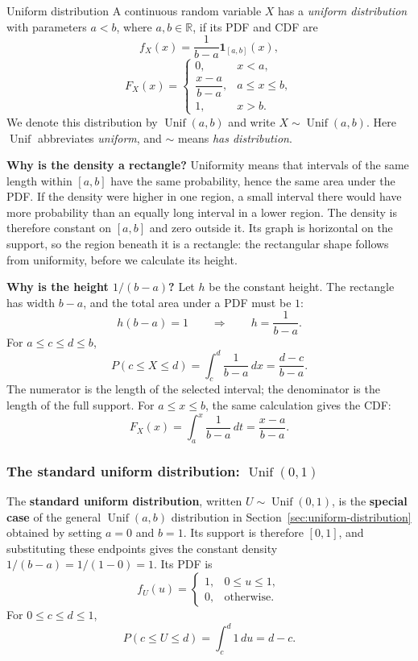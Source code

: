 \documentclass[a4paper,12pt,oneside]{report}
\begin{document}
\begin{frameddefn}{Uniform distribution}
\label{def:uniform-distribution}
A continuous random variable $X$ has a \emph{uniform distribution}
with parameters $a<b$, where $a,b\in\mathbb R$, if its PDF and CDF
are
\[
  f_X(x)=\frac{1}{b-a}\mathbf 1_{[a,b]}(x),
\]
\[
  F_X(x)=
  \begin{cases}
    0, & x<a,\\
    \dfrac{x-a}{b-a}, & a\leq x\leq b,\\
    1, & x>b.
  \end{cases}
\]
We denote this distribution by $\operatorname{Unif}(a,b)$ and write
$X\sim\operatorname{Unif}(a,b)$. Here $\operatorname{Unif}$
abbreviates \emph{uniform}, and $\sim$ means \emph{has distribution}.
\end{frameddefn}

\textbf{Why is the density a rectangle?} Uniformity means that
intervals of the same length within $[a,b]$ have the same
probability, hence the same area under the PDF. If the density
were higher in one region, a small interval there would have
more probability than an equally long interval in a lower region.
The density is therefore constant on $[a,b]$ and zero outside it.
Its graph is horizontal on the support, so the region beneath it
is a rectangle: the rectangular shape follows from uniformity,
before we calculate its height.

\textbf{Why is the height $1/(b-a)$?} Let $h$ be the constant
height. The rectangle has width $b-a$, and the total area under
a PDF must be $1$:
\[
  h(b-a)=1\qquad\Longrightarrow\qquad h=\frac{1}{b-a}.
\]
For $a\leq c\leq d\leq b$,
\[
  P(c\leq X\leq d)=\int_c^d\frac{1}{b-a}\,dx
    =\frac{d-c}{b-a}.
\]
The numerator is the length of the selected interval; the
denominator is the length of the full support.\newline
For $a\leq x\leq b$, the same calculation gives the CDF:
\[
  F_X(x)=\int_a^x\frac{1}{b-a}\,dt=\frac{x-a}{b-a}.
\]

\subsubsection{The standard uniform distribution: $\operatorname{Unif}(0,1)$}
\label{sec:uniform-standard}
The \textbf{standard uniform distribution}, written
$U\sim\operatorname{Unif}(0,1)$, is the \textbf{special case} of
the general $\operatorname{Unif}(a,b)$ distribution in
Section~\ref{sec:uniform-distribution} obtained by setting $a=0$
and $b=1$.\newline
Its support is therefore $[0,1]$, and substituting
these endpoints gives the constant density
$1/(b-a)=1/(1-0)=1$. Its PDF is
\[
  f_U(u)=
  \begin{cases}
    1, & 0\leq u\leq1,\\
    0, & \text{otherwise}.
  \end{cases}
\]
For $0\leq c\leq d\leq1$,
\[
  P(c\leq U\leq d)=\int_c^d1\,du=d-c.
\]
\end{document}
